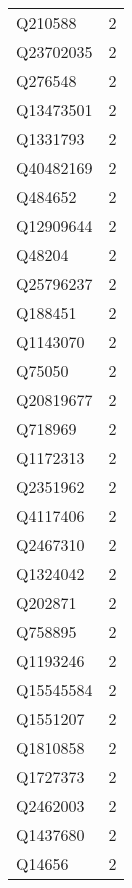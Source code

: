 \begin{tabular}{lr}
     Q210588 &                             2 \\
   Q23702035 &                             2 \\
     Q276548 &                             2 \\
   Q13473501 &                             2 \\
    Q1331793 &                             2 \\
   Q40482169 &                             2 \\
     Q484652 &                             2 \\
   Q12909644 &                             2 \\
      Q48204 &                             2 \\
   Q25796237 &                             2 \\
     Q188451 &                             2 \\
    Q1143070 &                             2 \\
      Q75050 &                             2 \\
   Q20819677 &                             2 \\
     Q718969 &                             2 \\
    Q1172313 &                             2 \\
    Q2351962 &                             2 \\
    Q4117406 &                             2 \\
    Q2467310 &                             2 \\
    Q1324042 &                             2 \\
     Q202871 &                             2 \\
     Q758895 &                             2 \\
    Q1193246 &                             2 \\
   Q15545584 &                             2 \\
    Q1551207 &                             2 \\
    Q1810858 &                             2 \\
    Q1727373 &                             2 \\
    Q2462003 &                             2 \\
    Q1437680 &                             2 \\
      Q14656 &                             2 \\

\end{tabular}

